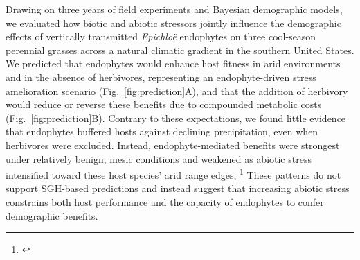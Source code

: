 \documentclass[12pt]{article}\usepackage[]{graphicx}\usepackage[dvipsnames]{xcolor}
\newcommand{\tom}[2]{{\color{red}{#1}}\footnote{\textit{\color{red}{#2}}}}
\begin{document}
Drawing on three years of field experiments and Bayesian demographic models, we evaluated how biotic and abiotic stressors jointly influence the demographic effects of vertically transmitted \textit{Epichloë} endophytes on three cool-season perennial grasses across a natural climatic gradient in the southern United States.
We predicted that endophytes would enhance host fitness in arid environments and in the absence of herbivores, representing an endophyte-driven stress amelioration scenario (Fig.~\ref{fig:prediction}A), and that the addition of herbivory would reduce or reverse these benefits due to compounded metabolic costs (Fig.~\ref{fig:prediction}B).
Contrary to these expectations, we found little evidence that endophytes buffered hosts against declining precipitation, even when herbivores were excluded.
Instead, endophyte-mediated benefits were strongest under relatively benign, mesic conditions and weakened as abiotic stress intensified toward these host species' arid range edges, \tom{while herbivory played a secondary and inconsistent role.}{It would be nice in this paragraph to more directly acknowledge the model selection results, which confirm climate as the key factor affecting endophyte benefits.}
These patterns do not support SGH-based predictions and instead suggest that increasing abiotic stress constrains both host performance and the capacity of endophytes to confer demographic benefits.
\end{document}
